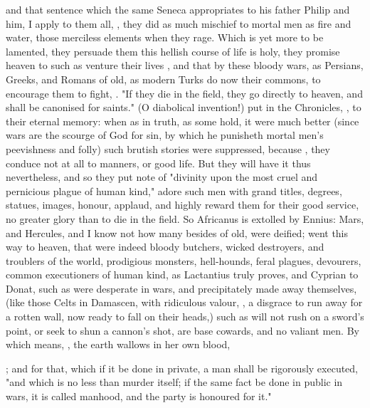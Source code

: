and that sentence which the same Seneca appropriates to his
father Philip and him, I apply to them all, , \etc{} they did as much
mischief to mortal men as fire and water, those merciless elements when they
rage. Which is yet more to be lamented, they persuade them
this hellish course of life is holy, they promise heaven to such as venture
their lives , and that by these bloody wars, as Persians,
Greeks, and Romans of old, as modern Turks do now their commons, to encourage
them to fight, . "If they die in the field, they go
directly to heaven, and shall be canonised for saints." (O diabolical
invention!) put in the Chronicles, , to their
eternal memory: when as in truth, as some hold, it were
much better (since wars are the scourge of God for sin, by which he punisheth
mortal men's peevishness and folly) such brutish stories were suppressed,
because , they conduce not at all to
manners, or good life. But they will have it thus nevertheless, and so they put
note of "divinity upon the most cruel and pernicious plague
of human kind," adore such men with grand titles, degrees, statues, images,
honour, applaud, and highly reward them for their good
service, no greater glory than to die in the field. So Africanus is extolled by
Ennius: Mars, and Hercules, and I know not how many besides
of old, were deified; went this way to heaven, that were indeed bloody
butchers, wicked destroyers, and troublers of the world, prodigious monsters,
hell-hounds, feral plagues, devourers, common executioners of human kind, as
Lactantius truly proves, and Cyprian to Donat, such as were desperate in wars,
and precipitately made away themselves, (like those Celts in Damascen, with
ridiculous valour, , a
disgrace to run away for a rotten wall, now ready to fall on their heads,) such
as will not rush on a sword's point, or seek to shun a cannon's shot, are base
cowards, and no valiant men. By which means, ,
the earth wallows in her own blood,

; and for
that, which if it be done in private, a man shall be rigorously executed,
"and which is no less than murder itself; if the same fact
be done in public in wars, it is called manhood, and the party is honoured for
it."

